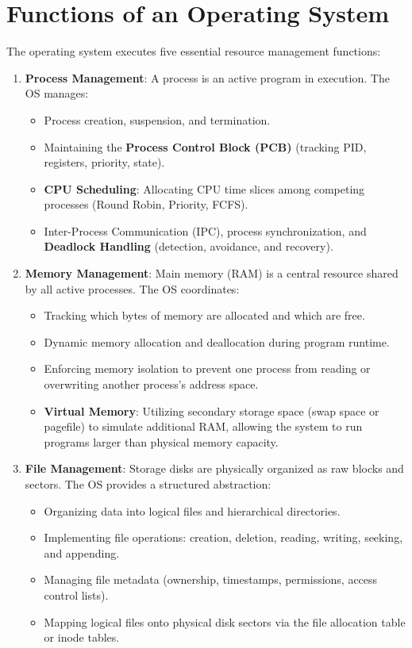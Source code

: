 \section{Functions of an Operating System}

The operating system executes five essential resource management functions:

\begin{enumerate}[leftmargin=1.5em]
    \item \textbf{Process Management}:
    A process is an active program in execution. The OS manages:
    \begin{itemize}
        \item Process creation, suspension, and termination.
        \item Maintaining the \textbf{Process Control Block (PCB)} (tracking PID, registers, priority, state).
        \item \textbf{CPU Scheduling}: Allocating CPU time slices among competing processes (Round Robin, Priority, FCFS).
        \item Inter-Process Communication (IPC), process synchronization, and \textbf{Deadlock Handling} (detection, avoidance, and recovery).
    \end{itemize}

    \item \textbf{Memory Management}:
    Main memory (RAM) is a central resource shared by all active processes. The OS coordinates:
    \begin{itemize}
        \item Tracking which bytes of memory are allocated and which are free.
        \item Dynamic memory allocation and deallocation during program runtime.
        \item Enforcing memory isolation to prevent one process from reading or overwriting another process's address space.
        \item \textbf{Virtual Memory}: Utilizing secondary storage space (swap space or pagefile) to simulate additional RAM, allowing the system to run programs larger than physical memory capacity.
    \end{itemize}

    \item \textbf{File Management}:
    Storage disks are physically organized as raw blocks and sectors. The OS provides a structured abstraction:
    \begin{itemize}
        \item Organizing data into logical files and hierarchical directories.
        \item Implementing file operations: creation, deletion, reading, writing, seeking, and appending.
        \item Managing file metadata (ownership, timestamps, permissions, access control lists).
        \item Mapping logical files onto physical disk sectors via the file allocation table or inode tables.
    \end{itemize}


\end{enumerate}
